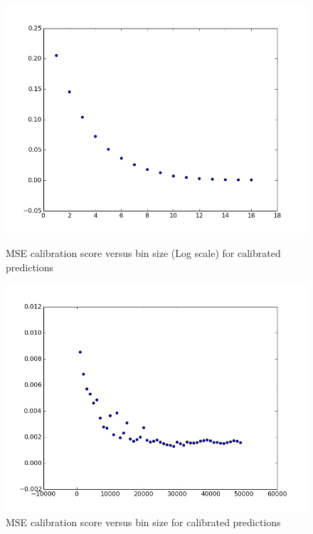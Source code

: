 \begin{figure}[t]
  \includegraphics[width=\linewidth]{calibrated_binsize_score_log_scale.png}
  \caption{MSE calibration score versus bin size (Log scale) for calibrated predictions}
  \label{fig:binsize_score_calib_log}
\endminipage\hfill
{}
  \includegraphics[width=\linewidth]{calibrated_binsize_score.png}
  \caption{MSE calibration score versus bin size for calibrated predictions}
  \label{fig:binsize_score_calib}
\endminipage\hfill
{}

\end{figure}
